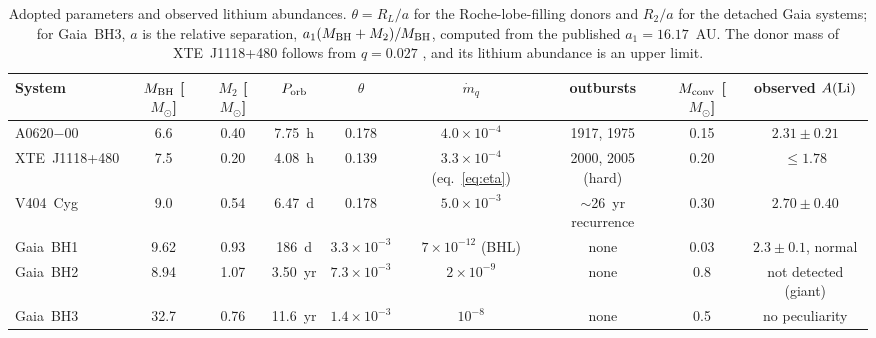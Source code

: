 \documentclass[twocolumn,showpacs,preprintnumbers,amsmath,amssymb]{revtex4}
\begin{document}
\begin{table}[t]
\caption{\label{tab:systems} Adopted parameters and observed lithium abundances. $\theta = R_L/a$ for the Roche-lobe-filling donors and $R_2/a$ for the detached Gaia systems; for Gaia~BH3, $a$ is the relative separation, $a_1(M_{\rm BH}+M_2)/M_{\rm BH}$, computed from the published $a_1=16.17$~AU. The donor mass of XTE~J1118+480 follows from $q=0.027$ \cite{GonzalezHernandez2008}, and its lithium abundance is an upper limit.}
\begin{ruledtabular}
\begin{tabular}{lcccccccc}
System & $M_{\rm BH}$ [$M_\odot$] & $M_2$ [$M_\odot$] & $P_{\rm orb}$ & $\theta$ & $\dot m_q$ & outbursts & $M_{\rm conv}$ [$M_\odot$] & observed $A({\rm Li})$ \\
\hline
A0620$-$00 & 6.6 \cite{Cantrell2010} & 0.40 \cite{Cantrell2010} & 7.75~h & 0.178 & $4.0\times10^{-4}$ \cite{NMY1996} & 1917, 1975 & 0.15 & $2.31\pm0.21$ \cite{GonzalezHernandez2004} \\
XTE~J1118+480 & 7.5 \cite{Khargharia2013} & 0.20 \cite{GonzalezHernandez2008} & 4.08~h & 0.139 & $3.3\times10^{-4}$ (eq.~\ref{eq:eta}) & 2000, 2005 (hard) & 0.20 & $\le 1.78$ \cite{GonzalezHernandez2008} \\
V404~Cyg & 9.0 \cite{Khargharia2010} & 0.54 \cite{GonzalezHernandez2011} & 6.47~d & 0.178 & $5.0\times10^{-3}$ \cite{NBM1997} & $\sim$26~yr recurrence & 0.30 & $2.70\pm0.40$ \cite{Casares2007} \\
Gaia~BH1 & 9.62 \cite{ElBadry_2023} & 0.93 \cite{ElBadry_2023} & 186~d & $3.3\times10^{-3}$ & $7\times10^{-12}$ (BHL) & none & 0.03 & $2.3\pm0.1$, normal \cite{ElBadry_2023} \\
Gaia~BH2 & 8.94 \cite{ElBadry2023BH2} & 1.07 \cite{ElBadry2023BH2} & 3.50~yr & $7.3\times10^{-3}$ & $2\times10^{-9}$ \cite{ElBadry2023BH2} & none & 0.8 & not detected (giant) \cite{ElBadry2023BH2} \\
Gaia~BH3 & 32.7 \cite{Panuzzo2024} & 0.76 \cite{Panuzzo2024} & 11.6~yr & $1.4\times10^{-3}$ & $10^{-8}$ \cite{Cappelluti2024} & none & 0.5 & no peculiarity \cite{Hackshaw2025} \\
\end{tabular}
\end{ruledtabular}
\end{table}
\end{document}
